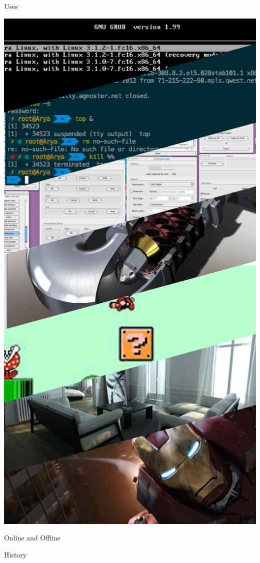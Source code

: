 \documentclass{lug}
\newcommand{\pmidg}[1]{\parbox{\widthof{#1}}{#1}}
\begin{document}
\begin{frame}{Uses}
\begin{minipage}{.35\textwidth}
        \pmidg{\includegraphics[width=\textwidth]{graphics/uses}}
    \end{minipage}
\end{frame}

\begin{frame}{Online and Offline}
\end{frame}

\begin{frame}{History}
\end{frame}
\end{document}
